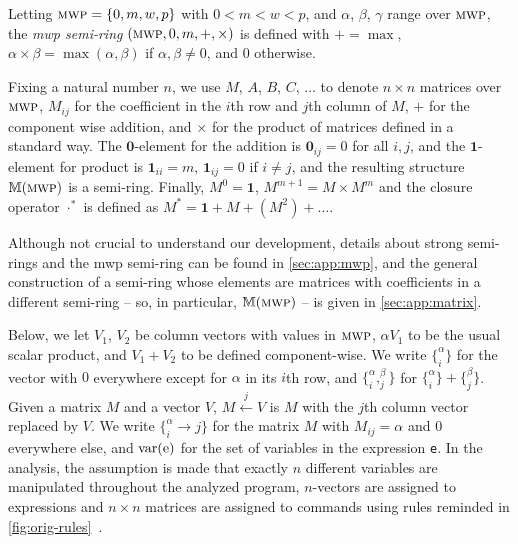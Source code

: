 \documentclass[runningheads]{llncs}
\DeclareMathOperator{\var}{var}
\newcommand{\zmat}{\mathbf{0}} %
\newcommand{\umat}{\mathbf{1}} %
\newcommand{\pr}{\lstinline[mathescape]}
\renewcommand{\oplus}{+}
\renewcommand{\otimes}{\times}
\begin{document}
\begin{definition}
	\label{def:mwp-matrix-alg}
	Letting \(\textsc{mwp} = \{0, m, w, p\}\) with \(0 < m < w < p\), and \(\alpha\), \(\beta\), \(\gamma\) range over \(\textsc{mwp}\), the \emph{mwp semi-ring} \((\textsc{mwp}, 0, m, +, \times)\) is defined with \(+ = \max\), \(\alpha \times \beta = \max (\alpha, \beta)\) if \(\alpha, \beta \neq 0\), and \(0\) otherwise.

	Fixing a natural number $n$, we use \(M\), \(A\), \(B\), \(C\), \(\hdots\) to denote \(n \times n\) matrices over \(\textsc{mwp}\), \(M_{ij}\) for the coefficient in the \(i\)th row and \(j\)th column of \(M\), \(\oplus\) for the component wise addition, and \(\otimes\) for the product of matrices defined in a standard way.
	The \(\zmat\)-element for the addition is \(\zmat_{ij} = 0\) for all \(i, j\), and the \(\umat\)-element for product is \(\umat_{ii} = m\), \(\umat_{ij} = 0\) if \(i \neq j\), and the resulting structure \(\mathbb{M}(\textsc{mwp})\) is a semi-ring.
	Finally, \(M^0 = \umat\), \(M^{m+1} = M \otimes M^m\) and the closure operator \(\cdot^{*}\) is defined as \(M^* = \umat \oplus M \oplus (M^2) \oplus \hdots\).
\end{definition}

Although not crucial to understand our development, details about strong semi-rings and the mwp semi-ring can be found in \autoref{sec:app:mwp}, and the general construction of a semi-ring whose elements are matrices with coefficients in a different semi-ring -- so, in particular, \(\mathbb{M}(\textsc{mwp})\) -- is given in \autoref{sec:app:matrix}.

Below, we let \(V_1\), \(V_2\) be column vectors with values in \(\textsc{mwp}\), \(\alpha V_1\) to be the usual scalar product, and \(V_1 \oplus V_2\) to be defined component-wise.
We write \(\{_{i}^{\alpha}\}\) for the vector with \(0\) everywhere except for \(\alpha\) in its \(i\)th row, and \(\{_{i}^{\alpha} , _{j}^{\beta}\}\) for \(\{_{i}^{\alpha}\} \oplus \{_{j}^{\beta}\}\).
Given a matrix \(M\) and a vector \(V\), \(M \xleftarrow{j} V\) is \(M\) with the \(j\)th column vector replaced by \(V\).
We write \(\{_{i}^{\alpha} \rightarrow j\}\) for the matrix \(M\) with \(M_{ij} = \alpha\) and \(0\) everywhere else, and \(\var(\text{\pr|e|})\) for the set of variables in the expression \pr|e|.
In the analysis, the assumption is made that exactly \(n\) different variables are manipulated throughout the analyzed program, \(n\)-vectors are assigned to expressions and \(n \times n\) matrices are assigned to commands using rules reminded in \autoref{fig:orig-rules}~\cite[Section 5]{Jones2009}.
\end{document}
